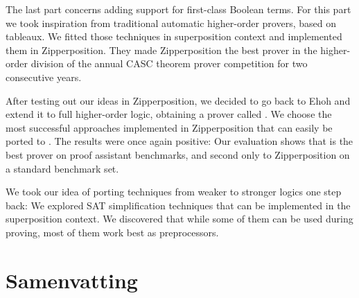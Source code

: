 The last part concerns adding support for
first-class Boolean terms. For this part we took inspiration from traditional
automatic higher-order provers, based on tableaux. We fitted those techniques in
superposition context and implemented them in Zipperposition. They
made Zipperposition the best prover in the higher-order division of the annual CASC
theorem prover competition for two consecutive years.

After testing out our ideas in Zipperposition, we decided to go back to Ehoh and
extend it to full higher-order logic, obtaining a prover called \ehohii{}. We
choose the most successful approaches implemented in Zipperposition that can
easily be ported to \ehohii{}. The results were once again positive: Our
evaluation shows that \ehohii{} is the best prover on proof assistant
benchmarks, and second only to Zipperposition on a standard benchmark set.

We took our idea of porting techniques from weaker to stronger logics one step
back: We explored SAT simplification techniques that can be implemented in the
superposition context. We discovered that while some of them can be used during proving,
most of them work best as preprocessors.


\chapter*{Samenvatting}

{


}



